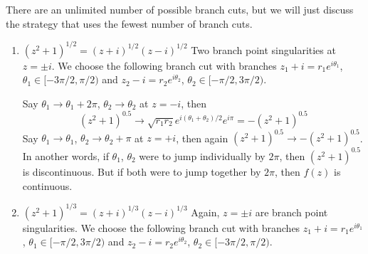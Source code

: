 \documentclass[a4paper]{article}
\begin{document}
\begin{ans}
There are an unlimited number of possible branch cuts, but we will just discuss the strategy that uses the fewest number of branch cuts.
\begin{enumerate}[label=(\roman*)]
\item $(z^2+1)^{1/2}=(z+i)^{1/2}(z-i)^{1/2}$
Two branch point singularities at $z=\pm i$. We choose the following branch cut with branches $z_1+i=r_1e^{i\theta_1}$, $\theta_1\in[-3\pi/2,\pi/2)$ and $z_2-i=r_2e^{i\theta_2}$, $\theta_2\in[-\pi/2,3\pi/2)$.
\begin{center}
\end{center}
Say $\theta_1\rightarrow\theta_1+2\pi$, $\theta_2\rightarrow\theta_2$ at $z=-i$, then
$$(z^2+1)^{0.5}\rightarrow\sqrt{r_1r_2}e^{i(\theta_1+\theta_2)/2}e^{i\pi}=-(z^2+1)^{0.5}$$
Say $\theta_1\rightarrow\theta_1$, $\theta_2\rightarrow\theta_2+\pi$ at $z=+i$, then again $(z^2+1)^{0.5}\rightarrow -(z^2+1)^{0.5}$. In another words, if $\theta_1$, $\theta_2$ were to jump individually by $2\pi$, then $(z^2+1)^{0.5}$ is discontinuous. But if both were to jump together by $2\pi$, then $f(z)$ is continuous.
\item 
$(z^2+1)^{1/3}=(z+i)^{1/3}(z-i)^{1/3}$
Again, $z=\pm i$ are branch point singularities. We choose the following branch cut with branches $z_1+i=r_1e^{i\theta_1}$, $\theta_1\in[-\pi/2,3\pi/2)$ and $z_2-i=r_2e^{i\theta_2}$, $\theta_2\in[-3\pi/2,\pi/2)$.
\begin{center}
\end{center}
\end{enumerate}
\end{ans}
\end{document}

